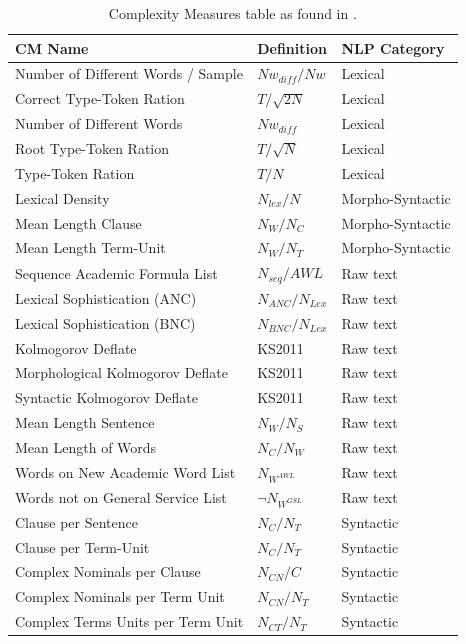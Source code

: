 \begin{table}[t]
	\center
	\caption {Complexity Measures table as found in \parencite{strobel2018text}.}\label{chap:relevant_work:tbl:complexity_measures}
	\begin{tabular}{lll}
		\hline
		CM Name & Definition & NLP Category \\
		\hline
		Number of Different Words / Sample & $Nw_{diff} / Nw$ & Lexical \\
		Correct Type-Token Ration & $T/\sqrt{2N}$ & Lexical \\
		Number of Different Words & $Nw_{diff}$ & Lexical \\
		Root Type-Token Ration & $T/\sqrt{N}$ & Lexical \\
		Type-Token Ration & $T/N$ & Lexical \\
		Lexical Density & $N_{lex}/N$ & Morpho-Syntactic \\
		Mean Length Clause & $N_{W}/N_{C}$ & Morpho-Syntactic \\
		Mean Length Term-Unit & $N_{W}/N_{T}$ & Morpho-Syntactic \\
		Sequence Academic Formula List & $N_{seq}/AWL$ & Raw text \\
		Lexical Sophistication (ANC) & $N_{ANC}/N_{Lex}$ & Raw text \\
		Lexical Sophistication (BNC) & $N_{BNC}/N_{Lex}$ & Raw text \\
		Kolmogorov Deflate & KS2011 & Raw text \\
		Morphological Kolmogorov Deflate & KS2011 & Raw text \\
		Syntactic Kolmogorov Deflate & KS2011 & Raw text \\
		Mean Length Sentence & $N_{W}/N_{S}$ & Raw text \\
		Mean Length of Words & $N_{C}/N_{W}$ & Raw text \\
		Words on New Academic Word List & ${N_{W^{AWL}}}$ & Raw text \\
		Words not on General Service List & $\neg{N_{W^{GSL}}}$ & Raw text \\
		Clause per Sentence & $N_{C}/N_{T}$ & Syntactic \\
		Clause per Term-Unit & $N_{C}/N_{T}$ & Syntactic \\
		Complex Nominals per Clause & $N_{CN}/C$ & Syntactic \\
		Complex Nominals per Term Unit & $N_{CN}/N_{T}$ & Syntactic \\
		Complex Terms Units per Term Unit & $N_{CT}/N_{T}$ & Syntactic \\

\end{tabular}
\end{table}
